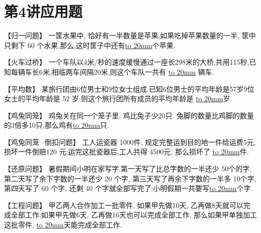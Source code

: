 \section{第4讲\quad 应用题}

\item {
    【归一问题】
    一筐水果中, 恰好有一半数量是苹果,如果吃掉苹果数量的一半, 筐中只剩下 60 个水果,那么,这时筐子中还有\underline{\hbox to 20mm{}}个苹果.
    \vspace{2cm} 
}

\item {
    【火车过桥】
    一个车队以4米/秒的速度缓慢通过一座长298米的大桥,共用115秒,已知每辆车长6米,相临两车间隔20米,则这个车队一共有 \underline{\hbox to 20mm{}} 辆车.
    \vspace{2cm}
}

\item {
    【平均数】
    某旅行团由6位男士和9位女士组成.已知6位男士的平均年龄是57岁9位女士的平均年龄是 52 岁.则这个旅行团所有成员的平均年龄是 \underline{\hbox to 20mm{}}岁.
    \vspace{2cm}
}

\item {
    【鸡兔同笼】
    鸡兔关在同一个笼子里, 鸡比兔子少20只. 兔脚的数量比鸡脚的数量的3倍多10只.那么鸡有\underline{\hbox to 20mm{}}只. 
    \vspace{2cm}
}

\item {
    【鸡兔同笼·倒扣问题】
    工人运瓷器 1000件, 规定完整运到目的地一件给运费5元, 损坏一件倒赔120 元;运完这批瓷器后,工人共得 4500元, 那么损坏了 \underline{\hbox to 20mm{}}件.
    \vspace{2cm}
}

\item {
    【还原问题】
    暑假期间小明在家写字.第一天写了比总字数的一半还少 50个的字, 第二天写了余下字数的一半还少 20 个字, 第三天写了再余下字数的一半多 10个字, 第四天写了 60 个字, 还剩 40 个字就全部写完了:小明假期一共要写\underline{\hbox to 20mm{}}个字.
    \vspace{2cm}
}

\item {
    【工程问题】
    甲乙两人合作加工一批零件, 如果甲先做10天, 乙再做8天就可以完成全部工作;如果甲先做6天, 乙再做16天也可以完成全部工作, 那么如果甲单独加工这批零件, \underline{\hbox to 20mm{}}天能完成全部工作.
    \vspace{2cm}
}

